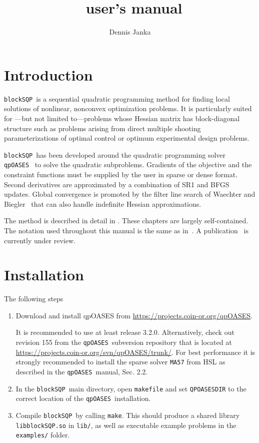 \documentclass[	11pt,
				a4paper,
				abstract=true,
				twoside=true,
				bibliography=totoc, 
				headinclude=true,
				footinclude=false]{scrartcl}
\title{\blockSQP\ user's manual}
\author{Dennis Janka}
\newcommand{\qpOASES}{\texttt{qpOASES}}
\newcommand{\blockSQP}{\texttt{blockSQP}}
\begin{document}
\maketitle
\tableofcontents
\clearpage
\section{Introduction}
\blockSQP\ is a sequential quadratic programming method for finding local solutions
of nonlinear, nonconvex optimization problems. It is particularly suited for
---but not limited to---problems whose Hessian matrix has block-diagonal
structure such as problems arising from direct multiple shooting
parameterizations of optimal control or optimum experimental design problems.

\blockSQP\ has been developed around the quadratic programming solver
\qpOASES~\cite{Ferreau2013} to solve the quadratic subproblems. Gradients of the objective
and the constraint functions must be supplied by the user in sparse or dense format. 
Second derivatives are approximated by a combination of SR1 and BFGS updates. 
Global convergence is promoted by the filter line search of Waechter and Biegler~\cite{Waechter2005b,Waechter2005}
that can also handle indefinite Hessian approximations.

The method is described in detail in \cite[Chapters 6--8]{Janka2015}. These chapters are largely self-contained. The notation used throughout this manual is the same as in~\cite{Janka2015}. A publication~\cite{Janka2015b} is currently under review.

\section{Installation}
The following steps

\begin{enumerate}
\item Download and install qpOASES from \url{https://projects.coin-or.org/qpOASES}.

	It is recommended to use at least release 3.2.0. Alternatively, check out revision 155 from the \qpOASES\ subversion repository that is located at \url{https://projects.coin-or.org/svn/qpOASES/trunk/}. For best performance it is strongly recommended to install the sparse solver \texttt{MA57} from HSL as described in the \qpOASES\ manual, Sec. 2.2.
\item In the \blockSQP\ main directory, open \texttt{makefile} and set \texttt{QPOASESDIR} to the correct location of the \qpOASES\ installation.
\item Compile \blockSQP\ by calling \texttt{make}. This should produce a shared library \texttt{libblockSQP.so} in  \texttt{lib/}, as well as executable example problems in the \texttt{examples/} folder.
\end{enumerate}
\end{document}

